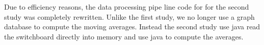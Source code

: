 Due to efficiency reasons, the data processing pipe line code for for the second study was completely rewritten. 
Unlike the first study, we no longer use a graph database to compute the moving averages. Instead the second study use java read the switchboard directly into memory and use java to compute the averages.  